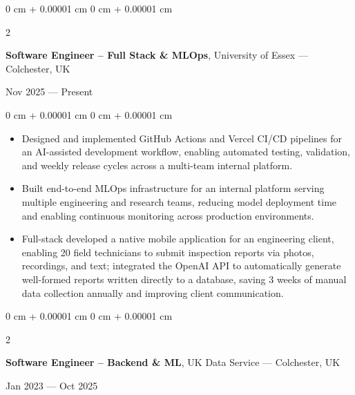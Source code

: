 \documentclass[6pt, letterpaper]{article}
\newenvironment{highlights}{
    \begin{itemize}[
        topsep=0.03 cm,
        parsep=0.03 cm,
        partopsep=0pt,
        itemsep=0pt,
        leftmargin=0 cm + 10pt
    ]
}{
    \end{itemize}
} %
\newenvironment{onecolentry}{
    \begin{adjustwidth}{
        0 cm + 0.00001 cm
    }{
        0 cm + 0.00001 cm
    }
}{
    \end{adjustwidth}
} %
\newenvironment{twocolentry}[2][]{
    \onecolentry
    \def\secondColumn{#2}
    \setcolumnwidth{\fill, 4.5 cm}
    \begin{paracol}{2}
}{
    \switchcolumn \raggedleft \secondColumn
    \end{paracol}
    \endonecolentry
} %
\begin{document}
        \begin{twocolentry}{Nov 2025 --- Present}
            \textbf{Software Engineer – Full Stack \& MLOps}, University of Essex --- Colchester, UK
        \end{twocolentry}

        \begin{onecolentry}
        \begin{highlights}

            \item Designed and implemented GitHub Actions and Vercel CI/CD pipelines for an AI-assisted development workflow, enabling automated testing, validation, and weekly release cycles across a multi-team internal platform.
            \item Built end-to-end MLOps infrastructure for an internal platform serving multiple engineering and research teams, reducing model deployment time and enabling continuous monitoring across production environments.
            \item Full-stack developed a native mobile application for an engineering client, enabling 20 field technicians to submit inspection reports via photos, recordings, and text; integrated the OpenAI API to automatically generate well-formed reports written directly to a database, saving 3 weeks of manual data collection annually and improving client communication.

        \end{highlights}
        \end{onecolentry}

        \begin{twocolentry}{Jan 2023 --- Oct 2025}
            \textbf{Software Engineer – Backend \& ML}, UK Data Service --- Colchester, UK
        \end{twocolentry}
\end{document}
